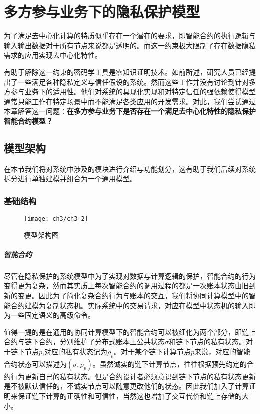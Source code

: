 \chapter{多方参与业务下的隐私保护模型}
为了满足去中心化计算的特质似乎存在一个潜在的要求，即智能合约的执行逻辑与输入输出数据对于所有节点来说都是透明的。而这一约束极大限制了存在数据隐私需求的应用实现去中心化特性。

有助于解除这一约束的密码学工具是零知识证明技术。如前所述，研究人员已经提出了一些满足各种隐私定义与信任假设的系统\cite{7546538, 2018arXiv180405141C}。然而这些工作并没有讨论到针对多方参与业务下的适用性。他们对系统的具现化实现和对特定信任的强依赖使得模型通常只能工作在特定场景中而不能满足各类应用的开发需求。对此，我们尝试通过本章解答这一问题：\textbf{在多方参与业务下是否存在一个满足去中心化特性的隐私保护智能合约模型？}

\section{模型架构}
在本节我们将对系统中涉及的模块进行介绍与功能划分，这有助于我们后续对系统拆分进行单独建模并组合为一个通用模型。
\subsection{基础结构}
\begin{figure}[htbp]
    \centering
    \texttt{[image: ch3/ch3-2]}
    \caption{\label{fig:ch3-structure}模型架构图}
\end{figure}

\paragraph{智能合约} 尽管在隐私保护的系统模型中为了实现对数据与计算逻辑的保护，智能合约的行为变得更为复杂，然而其实质上每次智能合约的调用过程的都是一次账本状态由旧到新的变更。因此为了简化复杂合约行为与账本的交互，我们将协同计算模型中的智能合约建模为复制状态机。实际系统中的交易请求，对应在模型中状态机的输入即为一些固定语义的高级命令。

值得一提的是在通用的协同计算模型下的智能合约可以被细化为两个部分，即链上合约与链下合约，分别维护了分布式账本上公共状态$\sigma$和链下节点的私有状态。对于链下节点$\mathit{p}$,对应的私有状态记为$\rho_\mathit{p}$。对于某个链下计算节点$p$来说，对应的智能合约状态可以描述为$(\sigma, \rho_\mathit{p})$。虽然诚实的链下计算节点，往往根据预先约定的合约行为更新自己的私有状态。但是合约设计者必须意识到链下节点的私有状态更新是不被默认信任的，不诚实节点可以随意更改他们的状态。因此我们加入了计算证明来保证链下计算的正确性和可信性，当然这也增加了交互代价和链上存储的大小。

